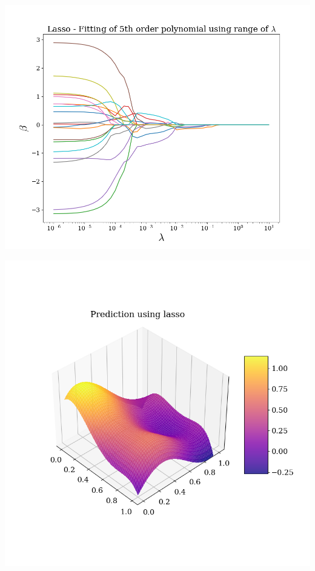 \documentclass[twoside,11pt]{report}
\begin{document}
\begin{minipage}[!t]{.48\linewidth}
    \begin{center}
        \includegraphics[width=1.0\textwidth]{../runsAndAdditions/betaOverLambdaLasso5.png}
\end{center}
\end{minipage}
\hspace{4mm}
\begin{minipage}[!t]{.48\linewidth}
    \begin{center}
        \includegraphics[width=1.0\textwidth]{../runsAndAdditions/predictionLasso.png}
    \end{center}
\end{minipage}\\
\end{document}
